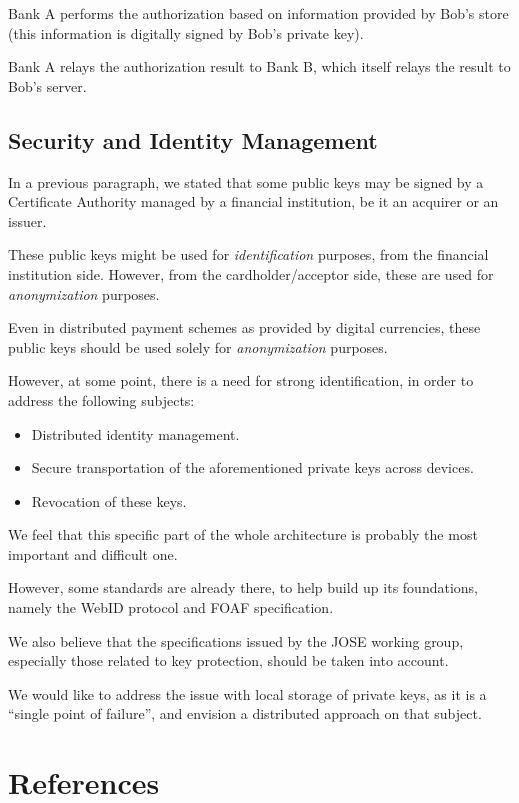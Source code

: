 Bank A performs the authorization based on information provided by Bob's
store (this information is digitally signed by Bob's private key).

Bank A relays the authorization result to Bank B, which itself relays
the result to Bob's server.

\subsection{Security and Identity
Management}\label{security-and-identity-management}

In a previous paragraph, we stated that some public keys may be signed
by a Certificate Authority managed by a financial institution, be it an
acquirer or an issuer.

These public keys might be used for \emph{identification} purposes, from
the financial institution side. However, from the cardholder/acceptor
side, these are used for \emph{anonymization} purposes.

Even in distributed payment schemes as provided by digital currencies,
these public keys should be used solely for \emph{anonymization}
purposes.

However, at some point, there is a need for strong identification, in
order to address the following subjects:

\begin{itemize}
\item
  Distributed identity management.
\item
  Secure transportation of the aforementioned private keys across
  devices.
\item
  Revocation of these keys.
\end{itemize}

We feel that this specific part of the whole architecture is probably
the most important and difficult one.

However, some standards are already there, to help build up its
foundations, namely the WebID protocol and FOAF specification.

We also believe that the specifications issued by the JOSE working
group, especially those related to key protection, should be taken into
account.

We would like to address the issue with local storage of private keys,
as it is a ``single point of failure'', and envision a distributed
approach on that subject.

\section{References}\label{references}

